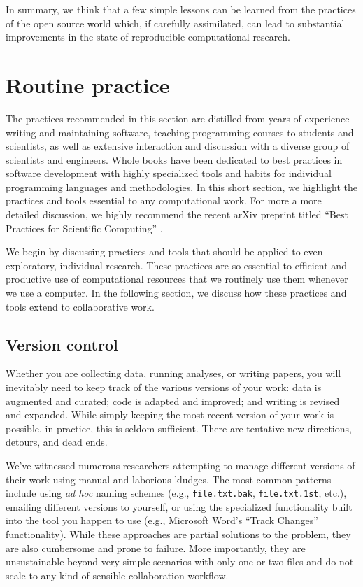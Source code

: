 \documentclass[ChapterTOCs,krantz2]{krantz} %
\begin{document}
In summary, we think that a few simple lessons can be learned from the
practices of the open source world which, if carefully assimilated, can lead to
substantial improvements in the state of reproducible computational research. 


\section{\label{sec:practice}Routine practice}

The practices recommended in this section are distilled from years of
experience writing and maintaining software, teaching programming courses to
students and scientists, as well as extensive interaction and discussion with a
diverse group of scientists and engineers.  Whole books have been dedicated to
best practices in software development with highly specialized tools and habits
for individual programming languages and methodologies.  In this short section,
we highlight the practices and tools essential to any computational work. For
more a more detailed discussion, we highly recommend the recent arXiv preprint
titled ``Best Practices for Scientific Computing'' \cite{2012arXiv1210.0530A}.

We begin by discussing practices and tools that should be applied to even
exploratory, individual research.  These practices are so essential to
efficient and productive use of computational resources that we routinely use
them whenever we use a computer. In the following section, we discuss how these
practices and tools extend to collaborative work. 

\subsection{Version control}

Whether you are collecting data, running analyses, or writing papers, you will
inevitably need to keep track of the various versions of your work: data is
augmented and curated; code is adapted and improved; and writing is revised and
expanded.  While simply keeping the most recent version of your work is
possible, in practice, this is seldom sufficient.  There are tentative new
directions, detours, and dead ends.

We've witnessed numerous researchers attempting to manage different versions of
their work using manual and laborious kludges. The most common patterns include
using \emph{ad hoc} naming schemes (e.g., \texttt{file.txt.bak},
\texttt{file.txt.1st}, etc.), emailing different versions to yourself, or using
the specialized functionality built into the tool you happen to use (e.g.,
Microsoft Word's ``Track Changes'' functionality).  While these approaches are
partial solutions to the problem, they are also cumbersome and prone to
failure.  More importantly, they are unsustainable beyond very
simple scenarios with only one or two files and do not scale to any kind of
sensible collaboration workflow.
\end{document}

